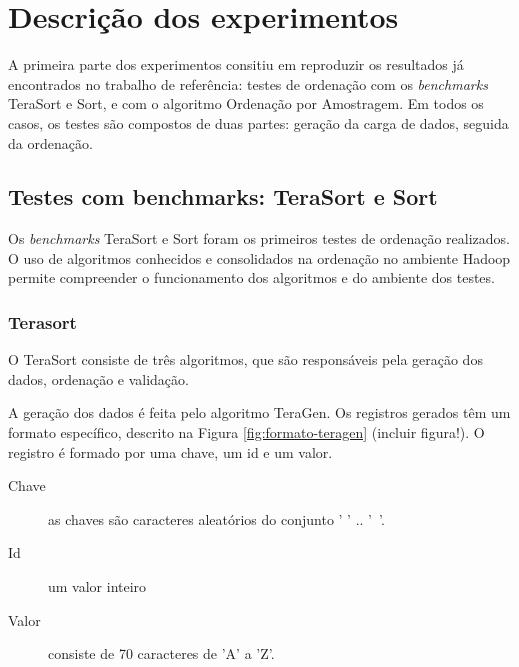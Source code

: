 \section{Descrição dos experimentos}

A primeira parte dos experimentos consitiu em reproduzir os resultados já encontrados no trabalho de referência: testes de ordenação com os \textit{benchmarks} TeraSort e Sort, e com o algoritmo Ordenação por Amostragem. 
Em todos os casos, os testes são compostos de duas partes: geração da carga de dados, seguida da ordenação. %


\subsection{Testes com benchmarks: TeraSort e Sort}

Os \textit{benchmarks} TeraSort e Sort foram os primeiros testes de ordenação realizados. O uso de algoritmos conhecidos e consolidados na ordenação no ambiente Hadoop permite compreender o funcionamento dos algoritmos e do ambiente dos testes.

\subsubsection{Terasort}
%
%

O TeraSort consiste de três algoritmos, que são responsáveis pela geração dos dados, ordenação e validação. 

A geração dos dados é feita pelo algoritmo TeraGen. Os registros gerados têm um formato específico, descrito na Figura \ref{fig:formato-teragen} (incluir figura!). O registro é formado por uma chave, um id e um valor.

\begin{description}
 \item[Chave] as chaves são caracteres aleatórios do conjunto ' ' .. '~'.
 \item[Id] um valor inteiro
 \item[Valor] consiste de 70 caracteres de 'A' a 'Z'. 
 \end{description}

